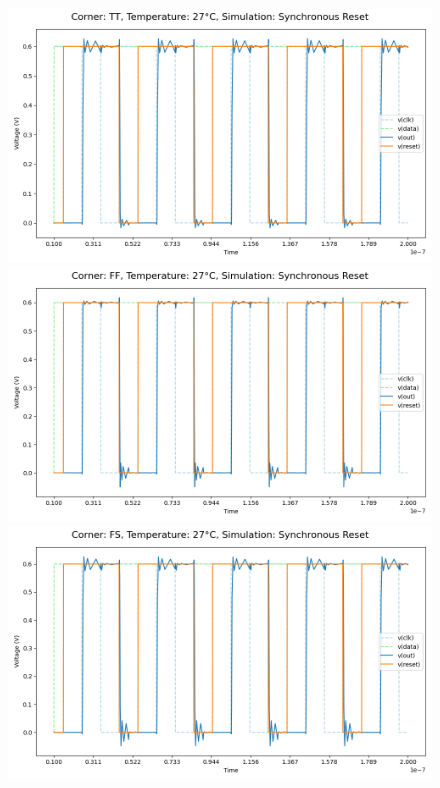\begin{figure}[H]
    \centering
    \includegraphics[height= 0.21\textheight]{figures/aimspice/TT27W3.png}
    \vspace{5pt}
    \includegraphics[height= 0.21\textheight]{figures/aimspice/FF27W3.png}
    \vspace{5pt}
    \includegraphics[height= 0.21\textheight]{figures/aimspice/FS27W3.png}

\end{figure}
